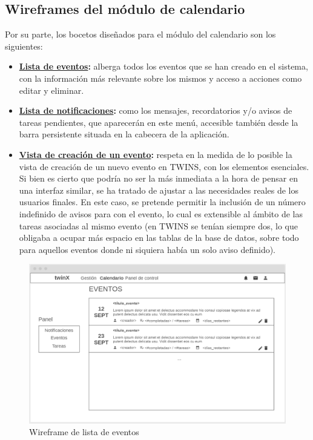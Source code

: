 \newpage

\subsection{Wireframes del módulo de calendario}

Por su parte, los bocetos diseñados para el módulo del calendario son los siguientes:

\begin{itemize}
	\item \textbf{\hyperref[fig:eventos_listaWF]{Lista de eventos}:} alberga todos los eventos que se han creado en el sistema, con la información más relevante sobre los mismos y acceso a acciones como editar y eliminar.
	\item \textbf{\hyperref[fig:notificaciones_listaWF]{Lista de notificaciones}:} como los mensajes, recordatorios y/o avisos de tareas pendientes, que aparecerán en este menú, accesible también desde la barra persistente situada en la cabecera de la aplicación.
	\item \textbf{\hyperref[fig:nuevo_eventoWF]{Vista de creación de un evento}:} respeta en la medida de lo posible la vista de creación de un nuevo evento en TWINS, con los elementos esenciales. Si bien es cierto que podría no ser la más inmediata a la hora de pensar en una interfaz similar, se ha tratado de ajustar a las necesidades reales de los usuarios finales. En este caso, se pretende permitir la inclusión de un número indefinido de avisos para con el evento, lo cual es extensible al ámbito de las tareas asociadas al mismo evento (en TWINS se tenían siempre dos, lo que obligaba a ocupar más espacio en las tablas de la base de datos, sobre todo para aquellos eventos donde ni siquiera había un solo aviso definido).	
\end{itemize}

\begin{figure}
	\centering
	\includegraphics[width=\textwidth]{img/Wireframes/Calendario/eventos_lista.png}
	\caption{Wireframe de lista de eventos}
	\label{fig:eventos_listaWF}
\end{figure}

